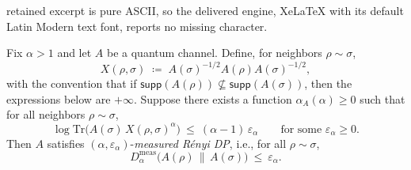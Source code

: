 \documentclass[10pt,a4paper]{amsart}
\def\Tr{\mathrm{Tr}}
\def\supp{\mathsf{supp}}
\begin{document}
retained excerpt is pure ASCII, so the delivered engine, XeLaTeX with its default Latin Modern text font, reports no missing character.
\begin{theorem}
\label{thm:qma-to-measured-rdp}
Fix $\alpha>1$ and let $A$ be a quantum channel. Define, for neighbors $\rho\sim\sigma$,
\[
X(\rho,\sigma)\;\coloneqq\;A(\sigma)^{-1/2}A(\rho)A(\sigma)^{-1/2},
\]
with the convention that if $\supp(A(\rho))\nsubseteq\supp(A(\sigma))$, then the expressions below
are $+\infty$. Suppose there exists a function $\alpha_A(\alpha)\ge 0$ such that for all neighbors
$\rho\sim\sigma$,
\begin{equation}
\label{eq:qma-bound-at-alpha}
\log \Tr\!\big(A(\sigma)\,X(\rho,\sigma)^{\alpha}\big)
\ \le\ (\alpha-1)\,\varepsilon_\alpha
\qquad\text{for some }\varepsilon_\alpha\ge 0.
\end{equation}
Then $A$ satisfies $(\alpha,\varepsilon_\alpha)$-\emph{measured R\'enyi DP}, i.e., for all
$\rho\sim\sigma$,
\[
D^{\mathrm{meas}}_\alpha\!\big(A(\rho)\,\|\,A(\sigma)\big)\ \le\ \varepsilon_\alpha.
\]
\end{theorem}
\end{document}
